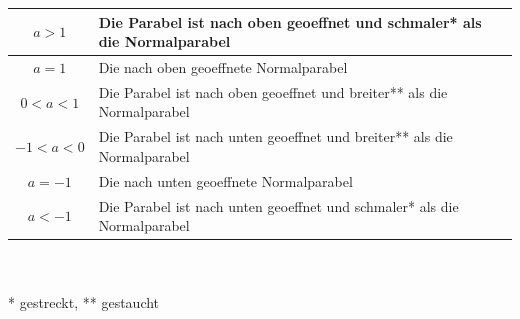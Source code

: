 \begin{multicols}{2}
    \begin{tabularx}{0.5\textwidth} {
            | >{\raggedright\arraybackslash}c
            | >{\raggedright\arraybackslash}X |}
        \hline
        $a > 1$      & Die Parabel ist nach oben geoeffnet und
        schmaler* als die Normalparabel                         \\ \hline
        $a = 1$      & Die nach oben geoeffnete Normalparabel   \\ \hline
        $0 < a < 1$  & Die Parabel ist nach oben geoeffnet und
        breiter**  als die Normalparabel                        \\ \hline
        $-1 < a < 0$ & Die Parabel ist nach unten geoeffnet und
        breiter**  als die Normalparabel                        \\ \hline
        $a = -1$     & Die nach unten geoeffnete Normalparabel  \\ \hline
        $a < -1$     & Die Parabel ist nach unten geoeffnet und
        schmaler*   als die Normalparabel                       \\ \hline
    \end{tabularx}
    \\~\\
    * gestreckt, ** gestaucht \\~\\

\end{multicols}
